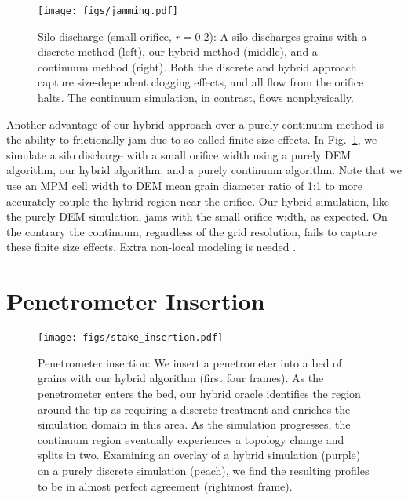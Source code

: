 \begin{figure}
  \centering
  \texttt{[image: figs/jamming.pdf]}
  \caption{
    Silo discharge (small orifice, $r=0.2$): A silo discharges grains with a discrete method (left), our hybrid
    method (middle), and a continuum method (right). Both the discrete and hybrid approach capture size-dependent clogging effects, and
    all flow from the orifice halts. The continuum simulation, in contrast, flows nonphysically.
  }
  \label{fig:hybrid:silo_frictoinal_jam}
\end{figure}

Another advantage of our hybrid approach over a purely continuum method is the ability to frictionally
jam due to so-called finite size effects. In Fig.~\ref{fig:hybrid:silo_frictoinal_jam}, we simulate a silo discharge with a small orifice
width using a purely DEM algorithm, our hybrid algorithm, and a purely continuum algorithm. Note that we use an MPM cell width to DEM mean grain diameter ratio of 1:1 to more accurately couple the hybrid region near the orifice. Our hybrid simulation, like the purely DEM simulation, jams with the small orifice width, as expected. On the contrary the continuum, regardless of the grid resolution, fails to capture these finite size effects. Extra non-local modeling is needed \cite{Kamrin:2014}.


\section{Penetrometer Insertion}
\begin{figure}
  \centering
  \texttt{[image: figs/stake\_insertion.pdf]}
  \caption{
    Penetrometer insertion: We insert a penetrometer into a bed of grains with our hybrid algorithm (first four frames).
    As the penetrometer enters the bed, our hybrid oracle identifies the region around the tip as requiring a discrete
    treatment and enriches the simulation domain in this area. As the simulation progresses, the continuum region
    eventually experiences a topology change and splits in two. Examining an overlay of a hybrid simulation (purple) on a purely discrete simulation (peach), we find the resulting profiles to be in almost perfect agreement (rightmost frame).
  }
  \label{fig:hybrid:stake_insertion}
\end{figure}

